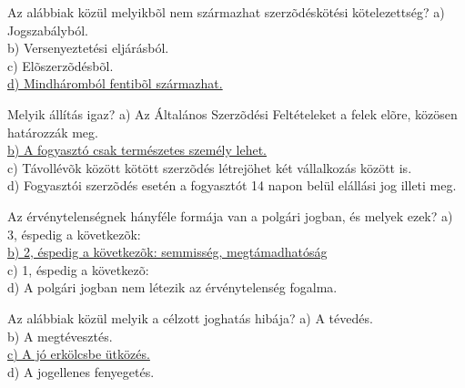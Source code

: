 \begin{frame}

\begin{tcolorbox}[title={152. Kérdés}]
Az alábbiak közül melyikbõl nem származhat szerzõdéskötési kötelezettség?
\tcblower
a) Jogszabályból.\\
b) Versenyeztetési eljárásból.\\
c) Elõszerzõdésbõl.\\
\uline {d) Mindháromból fentibõl származhat.}
\end{tcolorbox}

\begin{tcolorbox}[title={153. Kérdés}]
Melyik állítás igaz?
\tcblower
a) Az Általános Szerzõdési Feltételeket a felek elõre, közösen határozzák meg.\\
\uline {b) A fogyasztó csak természetes személy lehet.}\\
c) Távollévõk között kötött szerzõdés létrejöhet két vállalkozás között is.\\
d) Fogyasztói szerzõdés esetén a fogyasztót 14 napon belül elállási jog illeti meg.
\end{tcolorbox}

\begin{tcolorbox}[title={154. Kérdés}]
Az érvénytelenségnek hányféle formája van a polgári jogban, és melyek ezek?
\tcblower
a) 3, éspedig a következõk:\\
\uline {b) 2, éspedig a következõk: semmisség, megtámadhatóság}\\
c) 1, éspedig a következõ:\\
d) A polgári jogban nem létezik az érvénytelenség fogalma.
\end{tcolorbox}

\begin{tcolorbox}[title={155. Kérdés}]
Az alábbiak közül melyik a célzott joghatás hibája?
\tcblower
a) A tévedés.\\
b) A megtévesztés.\\
\uline {c) A jó erkölcsbe ütközés.}\\
d) A jogellenes fenyegetés.
\end{tcolorbox}

\end{frame}


